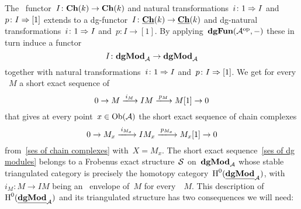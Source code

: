 \documentclass[a4paper,10pt]{scrartcl}
\begin{document}
The~{\klinear} functor~$I \colon \mathbf{Ch}(k) \to \mathbf{Ch}(k)$ and natural transformations~$i \colon 1 \Rightarrow I$ and~$p \colon I \Rightarrow [1]$ extends to a dg-functor~$I \colon \underline{\mathbf{Ch}}(k) \to \underline{\mathbf{Ch}}(k)$ and dg-natural transformations~$i \colon 1 \Rightarrow I$ and~$p \colon I \to [1]$.
By applying~$\mathbf{dgFun}(\mathcal{A}^{{\mathrm{op}}}, -)$ these in turn induce a {\klinear} functor
\[
  I
  \colon
  \mathbf{dgMod}_{\mathcal{A}}
  \to
  \mathbf{dgMod}_{\mathcal{A}}
\]
together with natural transformations~$i \colon 1 \Rightarrow I$ and~$p \colon I \Rightarrow [1]$.
We get for every {\dgmodule{$\Acat$}}~$M$ a short exact sequence of~{\dgmodules{$\Acat$}}
\begin{equation}
  \label{ses of dg modules}
  0
  \to
  M
  \xlongto{i_M}
  IM
  \xlongto{p_M}
  M[1]
  \to
  0
\end{equation}
that gives at every point~$x \in \operatorname{Ob}(\mathcal{A})$ the short exact sequence of chain complexes
\[
  0
  \to
  M_x
  \xlongto{i_{M_x}}
  IM_x
  \xlongto{p_{M_x}}
  M_x[1]
  \to
  0
\]
from~\eqref{ses of chain complexes} with~$X = M_x$.
The short exact sequence~\eqref{ses of dg modules} belongs to a Frobenus exact structure~$\Sfrob$ on~$\mathbf{dgMod}_{\mathcal{A}}$ whose stable triangulated category is precisely the homotopy category~$\operatorname{H}^0(\underline{\mathbf{dgMod}}_{\mathcal{A}})$, with~$i_M \colon M \to IM$ being an~{\injective{$\Sfrob$}} envelope of~$M$ for every~{\dgmodule{$\Acat$}}~$M$.
This description of~$\operatorname{H}^0(\underline{\mathbf{dgMod}}_{\mathcal{A}})$ and its triangulated structure has two consequences we will need:
\end{document}
